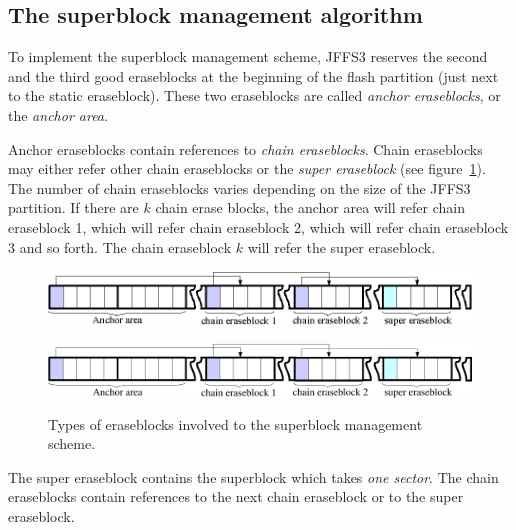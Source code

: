 %
%
%
%

%
%
\subsection{The superblock management algorithm} \label{ref_SectionSBAlg}

To implement the superblock management scheme, JFFS3 reserves the second and
the third good eraseblocks at the beginning of the flash partition (just next
to the static eraseblock). These two eraseblocks are called \emph{anchor
eraseblocks}, or the \emph{anchor area}.

Anchor eraseblocks contain references to \emph{chain eraseblocks}. Chain
eraseblocks may either refer other chain eraseblocks or the \emph{super
eraseblock} (see figure~\ref{ref_FigureSB_01}). The number of chain eraseblocks
varies depending on the size of the JFFS3 partition. If there are $k$ chain
erase blocks, the anchor area will refer chain eraseblock 1, which will refer
chain eraseblock 2, which will refer chain eraseblock 3 and so forth. The chain
eraseblock $k$ will refer the super eraseblock.

%
%
\begin{figure}[h]
\begin{center}
\begin{htmlonly}
\includegraphics{pics/sb-01.png}
\end{htmlonly}
\includegraphics[width=159mm,height=21mm]{pics/sb-01.pdf}
\end{center}
\caption{Types of eraseblocks involved to the superblock management scheme.}
\label{ref_FigureSB_01}
\end{figure}

The super eraseblock contains the superblock which takes \emph{one sector}. The
chain eraseblocks contain references to the next chain eraseblock or to the
super eraseblock.

